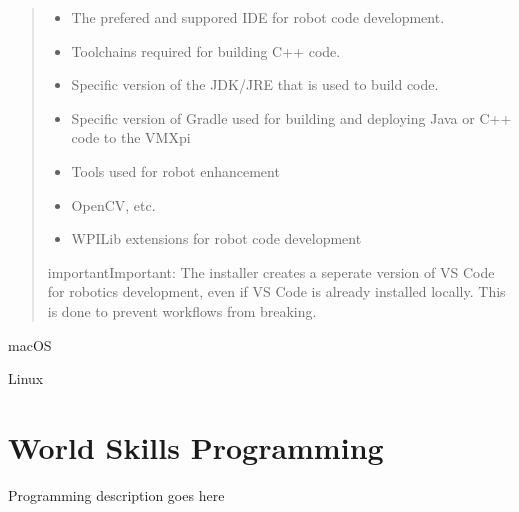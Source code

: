 \documentclass[letterpaper,10pt,english]{sphinxmanual}
\begin{document}
\begin{quote}
\begin{itemize}
\item {} 
 \sphinxhyphen{} The prefered and suppored IDE for robot code development.

\item {} 
 \sphinxhyphen{} Toolchains required for building C++ code.

\item {} 
 \sphinxhyphen{} Specific version of the JDK/JRE that is used to build code.

\item {} 
 \sphinxhyphen{} Specific version of Gradle used for building and deploying Java or C++ code to the VMXpi

\item {} 
 \sphinxhyphen{} Tools used for robot enhancement

\item {} 
 \sphinxhyphen{} OpenCV, etc.

\item {} 
 \sphinxhyphen{} WPILib extensions for robot code development

\end{itemize}

\begin{sphinxadmonition}{important}{Important:}
The installer creates a seperate version of VS Code for robotics development, even if VS Code is already installed locally. This is done to prevent workflows from breaking.
\end{sphinxadmonition}
\end{quote}

macOS


Linux



\chapter{World Skills Programming}
\label{\detokenize{docs/WorldSkills/programming:world-skills-programming}}\label{\detokenize{docs/WorldSkills/programming::doc}}
Programming description goes here
\end{document}
